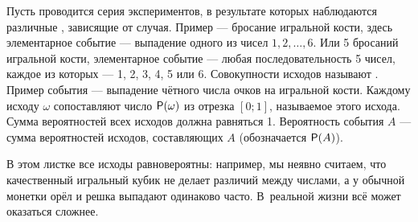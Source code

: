 \documentclass[a4paper,12pt]{article}
\begin{document}



\medskip

{\small\rm
Пусть проводится серия экспериментов,
в результате которых наблюдаются различные
,
зависящие от случая.
Пример --- бросание игральной кости, здесь элементарное
событие --- выпадение одного из чисел $1, 2,\dots ,6$.
Или 5 бросаний игральной кости, элементарное событие --- любая последовательность 5 чисел, каждое из которых --- 1, 2, 3, 4, 5 или 6.
Совокупности исходов называют .
Пример события --- выпадение ч\"етного числа очков на игральной кости.
Каждому исходу $\omega$ сопоставляют число ${\sf P}(\omega)$ из отрезка
$[0;1]$, называемое  этого исхода.
Сумма вероятностей всех %
исходов должна равняться 1.
Вероятность события $A$ --- сумма вероятностей исходов, составляющих %
$A$ (обозначается ${\sf P}(A)$).

В этом листке все исходы равновероятны: например, мы неявно считаем, что качественный игральный кубик не делает различий между числами, а у обычной монетки орёл и решка выпадают одинаково часто. В~реальной жизни всё может оказаться сложнее.

}

\smallskip


\end{document}
